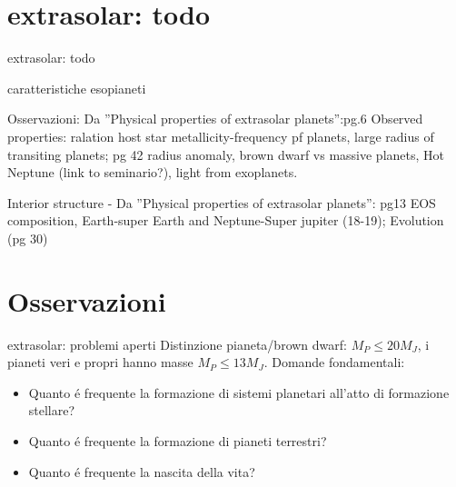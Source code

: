 \section{extrasolar: todo}

\begin{frame}{extrasolar: todo}

\begin{workout}{caratteristiche esopianeti}
\item Osservazioni: Da ''Physical properties of extrasolar planets'':pg.6  Observed properties: ralation host star metallicity-frequency pf planets, large radius of transiting planets; pg 42 radius anomaly, brown dwarf vs massive planets, Hot Neptune (link to seminario?), light from exoplanets.
\item Interior structure - Da ''Physical properties of extrasolar planets'': pg13 EOS composition, Earth-super Earth and Neptune-Super jupiter (18-19); Evolution (pg 30)
\end{workout}

\end{frame}

\section{Osservazioni}

\begin{wordonframe}{extrasolar: problemi aperti}
Distinzione pianeta/brown dwarf: $M_P\leq20M_J$, i pianeti veri e propri hanno masse $M_P\leq13M_J$.
Domande fondamentali:
\begin{itemize}
    \item Quanto \'e frequente la formazione di sistemi planetari all'atto di formazione stellare?
    \item Quanto \'e frequente la formazione di pianeti terrestri?
    \item Quanto \'e frequente la nascita della vita?
\end{itemize}
\end{wordonframe}